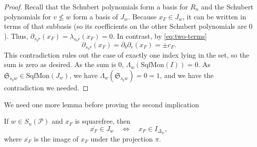 \begin{proof}
Recall that the Schubert polynomials form a basis for $R_n$ and the Schubert polynomials for $v\not\leq w$ form a basis of $J_w$.
Because \(x_F\in J_w\), it can be written in terms of that subbasis (so its coefficients on the other Schubert polynomials are $0$).
Thus,  \(\partial_{s_br}(x_F)=\lambda_{s_br}(x_F)=0\).  
In contrast, by \eqref{eq:two-terms}
\[  
\partial_{s_br}(x_F)=\partial_b\partial_r(x_F) =\pm c_F. 
\] 
This contradiction rules out the case of exactly one index lying in the set, so the sum is zero as desired.
As the sum is $0$, $\Lambda_{w}(\mathrm{SqfMon}(I))=0$.
As $\mathfrak{S}_{s_qw} \in \mathrm{SqfMon}(J_w)$, we have $\Lambda_{w}(\mathfrak{S}_{s_qw}) = 0 = 1$, and we have the contradiction we needed.
\end{proof}


We need one more lemma before proving the second implication 

\begin{proposition}
\label{prop:lift}
If \(w\in S_n(\mathcal{P})\) and \(x_F\) is squarefree, then
\[ 
\overline{x_F}\in J_w \quad\Longleftrightarrow\quad  x_F\in I_{\Delta_w}, 
\]
where $\overline{x_F}$ is the image of $x_F$ under the projection $\pi$.
\end{proposition}

